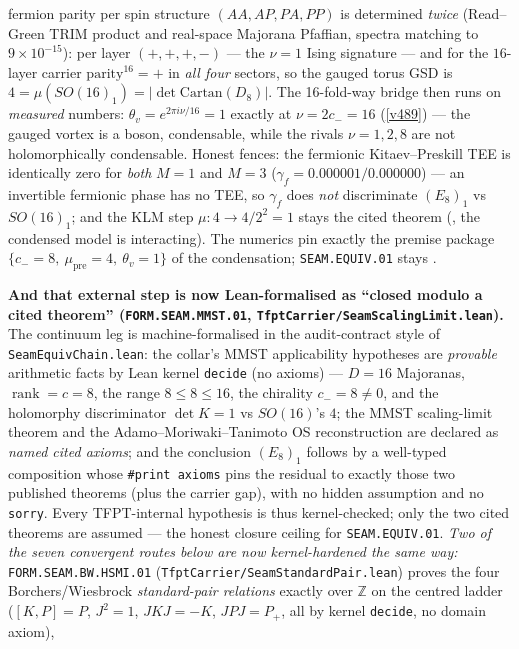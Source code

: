 fermion parity per spin structure $(AA,AP,PA,PP)$ is determined \emph{twice} (Read--Green TRIM product and
real-space Majorana Pfaffian, spectra matching to $9{\times}10^{-15}$): per layer $(+,+,+,-)$ --- the
$\nu{=}1$ Ising signature --- and for the $16$-layer carrier $\mathrm{parity}^{16}={+}$ in \emph{all four}
sectors, so the gauged torus GSD is $4=\mu(SO(16)_1)=|\det\mathrm{Cartan}(D_8)|$. The 16-fold-way bridge
then runs on \emph{measured} numbers: $\theta_v=e^{2\pi i\nu/16}=1$ exactly at $\nu=2c_-=16$ (\vref{v489})
--- the gauged vortex is a boson, condensable, while the rivals $\nu=1,2,8$ are not holomorphically
condensable. Honest fences: the fermionic Kitaev--Preskill TEE is identically zero for \emph{both} $M{=}1$
and $M{=}3$ ($\gamma_f=0.000001/0.000000$) --- an invertible fermionic phase has no TEE, so $\gamma_f$ does
\emph{not} discriminate $(E_8)_1$ vs $SO(16)_1$; and the KLM step $\mu:4\to4/2^2=1$ stays the cited
theorem (\mC, the condensed model is interacting). The numerics pin exactly the premise package
$\{c_-{=}8,\ \mu_{\mathrm{pre}}{=}4,\ \theta_v{=}1\}$ of the condensation; \texttt{SEAM.EQUIV.01} stays \mO.
\par\smallskip\noindent\textbf{And that external step is now Lean-formalised as ``closed modulo a cited
theorem'' (\texttt{FORM.SEAM.MMST.01}, \texttt{TfptCarrier/SeamScalingLimit.lean}).} The continuum leg is
machine-formalised in the audit-contract style of \texttt{SeamEquivChain.lean}: the collar's MMST
applicability hypotheses are \emph{provable} arithmetic facts by Lean kernel \texttt{decide} (no axioms) ---
$D{=}16$ Majoranas, $\operatorname{rank}{=}c{=}8$, the range $8\le8\le16$, the chirality $c_-{=}8\neq0$, and
the holomorphy discriminator $\det K{=}1$ vs $SO(16)$'s $4$; the MMST scaling-limit theorem and the
Adamo--Moriwaki--Tanimoto OS reconstruction are declared as \emph{named cited axioms}; and the conclusion
$(E_8)_1$ follows by a well-typed composition whose \texttt{\#print axioms} pins the residual to exactly those
two published theorems (plus the carrier gap), with no hidden assumption and no \texttt{sorry}. Every
TFPT-internal hypothesis is thus kernel-checked; only the two cited theorems are assumed --- the honest
closure ceiling for \texttt{SEAM.EQUIV.01}. \emph{Two of the seven convergent routes below are now
kernel-hardened the same way:} \texttt{FORM.SEAM.BW.HSMI.01} (\texttt{TfptCarrier/SeamStandardPair.lean})
proves the four Borchers/Wiesbrock \emph{standard-pair relations} exactly over $\mathbb{Z}$ on the centred
ladder ($[K,P]{=}P$, $J^2{=}1$, $JKJ{=}{-}K$, $JPJ{=}P_+$, all by kernel \texttt{decide}, no domain axiom),
